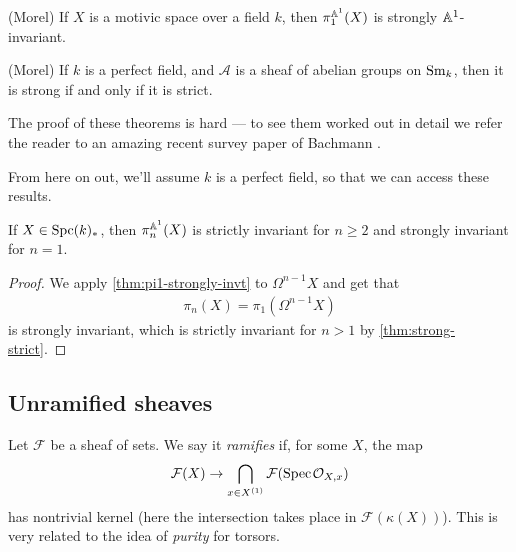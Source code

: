 \documentclass[11pt,openany]{book}
\begin{document}
\begin{theorem}\label{thm:pi1-strongly-invt} 
(Morel) If $X$ is a motivic space over a field $k$, then $\pi_1^{\mathbb{A}^1}(X)$ is strongly $\mathbb{A}^1$-invariant.
\end{theorem}

\begin{theorem}\label{thm:strong-strict}
(Morel)
If $k$ is a perfect field, and $\mathcal{A}$ is a sheaf of abelian groups on $\mathrm{Sm}_k$, then it is strong if and only if it is strict.
\end{theorem}

The proof of these theorems is hard --- to see them worked out in detail we refer the reader to an amazing recent survey paper of Bachmann \cite{bachmannstrongly}.



\begin{assumption} From here on out, we'll assume $k$ is a perfect field, so that we can access these results.
\end{assumption}


\begin{corollary} If $X\in \mathrm{Spc}(k)_\ast$, then $\pi_n^{\mathbb{A}^1}(X)$ is strictly invariant for $n\ge 2$ and strongly invariant for $n=1$.
\end{corollary}
\begin{proof} We apply \autoref{thm:pi1-strongly-invt} to $\Omega^{n-1}X$ and get that
\begin{align*}
    \pi_n(X) = \pi_1(\Omega^{n-1} X)
\end{align*}
is strongly invariant, which is strictly invariant for $n>1$ by \autoref{thm:strong-strict}.
\end{proof}




\subsection{Unramified sheaves}



Let $\mathcal{F}$ be a sheaf of sets. We say it \textit{ramifies} if, for some $X$, the map
\begin{align*}
    \mathcal{F}(X) \to \bigcap_{x\in X^{(1)}} \mathcal{F}(\text{Spec}\hspace{0.1em} \mathcal{O}_{X,x})
\end{align*}
has nontrivial kernel (here the intersection takes place in $\mathcal{F}(\kappa(X))$). This is very related to the idea of \textit{purity} for torsors.
\end{document}
